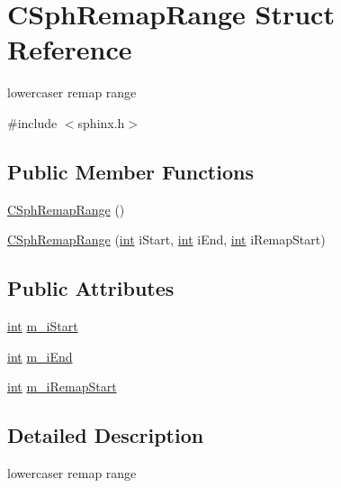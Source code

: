 \hypertarget{structCSphRemapRange}{\section{C\-Sph\-Remap\-Range Struct Reference}
\label{structCSphRemapRange}
}


lowercaser remap range  




{\ttfamily \#include $<$sphinx.\-h$>$}

\subsection*{Public Member Functions}
\begin{DoxyCompactItemize}
\item 
\hyperlink{structCSphRemapRange_ab6a1fe81ebf70b3699f5ffdd2c09fb20}{C\-Sph\-Remap\-Range} ()
\item 
\hyperlink{structCSphRemapRange_a0630615f3eb6eb5bec96437ab821e844}{C\-Sph\-Remap\-Range} (\hyperlink{sphinxexpr_8cpp_a4a26e8f9cb8b736e0c4cbf4d16de985e}{int} i\-Start, \hyperlink{sphinxexpr_8cpp_a4a26e8f9cb8b736e0c4cbf4d16de985e}{int} i\-End, \hyperlink{sphinxexpr_8cpp_a4a26e8f9cb8b736e0c4cbf4d16de985e}{int} i\-Remap\-Start)
\end{DoxyCompactItemize}
\subsection*{Public Attributes}
\begin{DoxyCompactItemize}
\item 
\hyperlink{sphinxexpr_8cpp_a4a26e8f9cb8b736e0c4cbf4d16de985e}{int} \hyperlink{structCSphRemapRange_aae595e8e408fa266328b2542186140a4}{m\-\_\-i\-Start}
\item 
\hyperlink{sphinxexpr_8cpp_a4a26e8f9cb8b736e0c4cbf4d16de985e}{int} \hyperlink{structCSphRemapRange_a67482e621525e0338ef4266448b5d84b}{m\-\_\-i\-End}
\item 
\hyperlink{sphinxexpr_8cpp_a4a26e8f9cb8b736e0c4cbf4d16de985e}{int} \hyperlink{structCSphRemapRange_a1b7062de3d8bfe002d16d5a1ee09c341}{m\-\_\-i\-Remap\-Start}
\end{DoxyCompactItemize}


\subsection{Detailed Description}
lowercaser remap range 

